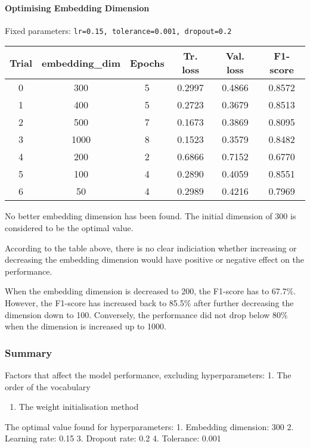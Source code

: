 \documentclass[11pt]{article}
\providecommand{\tightlist}{%
      \setlength{\itemsep}{0pt}\setlength{\parskip}{0pt}}
\begin{document}
\hypertarget{optimising-embedding-dimension}{%
\paragraph{Optimising Embedding
Dimension}\label{optimising-embedding-dimension}}

Fixed parameters: \texttt{lr=0.15,\ tolerance=0.001,\ dropout=0.2}

\begin{longtable}[]{@{}cccccc@{}}
\toprule
Trial & embedding\_dim & Epochs & Tr. loss & Val. loss &
F1-score\tabularnewline
\midrule
\endhead
0 & 300 & 5 & 0.2997 & 0.4866 & 0.8572\tabularnewline
1 & 400 & 5 & 0.2723 & 0.3679 & 0.8513\tabularnewline
2 & 500 & 7 & 0.1673 & 0.3869 & 0.8095\tabularnewline
3 & 1000 & 8 & 0.1523 & 0.3579 & 0.8482\tabularnewline
4 & 200 & 2 & 0.6866 & 0.7152 & 0.6770\tabularnewline
5 & 100 & 4 & 0.2890 & 0.4059 & 0.8551\tabularnewline
6 & 50 & 4 & 0.2989 & 0.4216 & 0.7969\tabularnewline
\bottomrule
\end{longtable}

No better embedding dimension has been found. The initial dimension of
300 is considered to be the optimal value.

According to the table above, there is no clear indiciation whether
increasing or decreasing the embedding dimension would have positive or
negative effect on the performance.

When the embedding dimension is decreased to 200, the F1-score has to
67.7\%. However, the F1-score has increased back to 85.5\% after further
decreasing the dimension down to 100. Conversely, the performance did
not drop below 80\% when the dimension is increased up to 1000.

\hypertarget{summary}{%
\subsubsection{Summary}\label{summary}}

Factors that affect the model performance, excluding hyperparameters: 1.
The order of the vocabulary

\begin{enumerate}
\def\labelenumi{\arabic{enumi}.}
\setcounter{enumi}{1}
\tightlist
\item
  The weight initialisation method
\end{enumerate}

The optimal value found for hyperparameters: 1. Embedding dimension: 300
2. Learning rate: 0.15 3. Dropout rate: 0.2 4. Tolerance: 0.001
\end{document}
